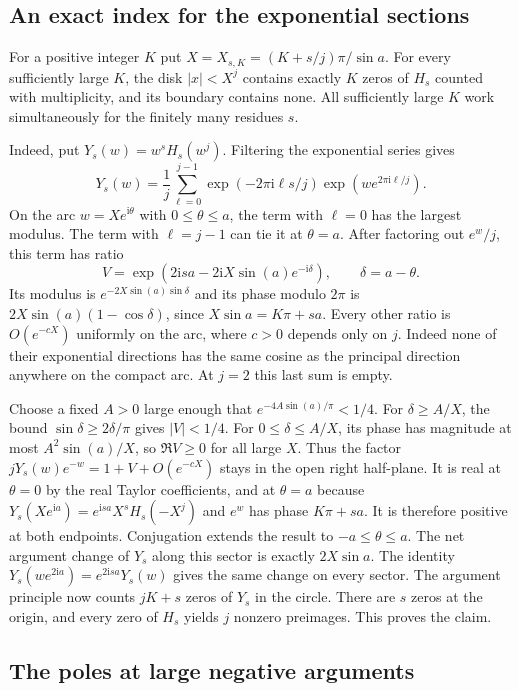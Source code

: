 \documentclass[11pt]{article}
\begin{document}
\subsection{An exact index for the exponential sections}

For a positive integer $K$ put $X=X_{s,K}=(K+s/j)\pi/\sin a$. For every sufficiently large $K$, the disk $|x|<X^j$ contains exactly $K$ zeros of $H_s$ counted with multiplicity, and its boundary contains none. All sufficiently large $K$ work simultaneously for the finitely many residues $s$.

Indeed, put $Y_s(w)=w^s H_s(w^j)$. Filtering the exponential series gives
\[
Y_s(w)=\frac1j\sum_{\ell=0}^{j-1}\exp(-2\pi\mathrm{i}\ell s/j)\exp(w e^{2\pi\mathrm{i}\ell/j}).
\]
On the arc $w=Xe^{\mathrm{i}\theta}$ with $0\le\theta\le a$, the term with $\ell=0$ has the largest modulus. The term with $\ell=j-1$ can tie it at $\theta=a$. After factoring out $e^w/j$, this term has ratio
\[
V=\exp(2\mathrm{i}sa-2\mathrm{i}X\sin(a)e^{-\mathrm{i}\delta}),\qquad \delta=a-\theta.
\]
Its modulus is $e^{-2X\sin(a)\sin\delta}$ and its phase modulo $2\pi$ is $2X\sin(a)(1-\cos\delta)$, since $X\sin a=K\pi+sa$. Every other ratio is $O(e^{-cX})$ uniformly on the arc, where $c>0$ depends only on $j$. Indeed none of their exponential directions has the same cosine as the principal direction anywhere on the compact arc. At $j=2$ this last sum is empty.

Choose a fixed $A>0$ large enough that $e^{-4 A\sin(a)/\pi}<1/4$. For $\delta\ge A/X$, the bound $\sin\delta\ge2\delta/\pi$ gives $|V|<1/4$. For $0\le\delta\le A/X$, its phase has magnitude at most $A^2\sin(a)/X$, so $\Re V\ge0$ for all large $X$. Thus the factor $jY_s(w)e^{-w}=1+V+O(e^{-cX})$ stays in the open right half-plane. It is real at $\theta=0$ by the real Taylor coefficients, and at $\theta=a$ because $Y_s(Xe^{\mathrm{i}a})=e^{\mathrm{i}sa}X^s H_s(-X^j)$ and $e^w$ has phase $K\pi+sa$. It is therefore positive at both endpoints. Conjugation extends the result to $-a\le\theta\le a$. The net argument change of $Y_s$ along this sector is exactly $2X\sin a$. The identity $Y_s(we^{2\mathrm{i}a})=e^{2\mathrm{i}sa}Y_s(w)$ gives the same change on every sector. The argument principle now counts $jK+s$ zeros of $Y_s$ in the circle. There are $s$ zeros at the origin, and every zero of $H_s$ yields $j$ nonzero preimages. This proves the claim.

\subsection{The poles at large negative arguments}
\end{document}
